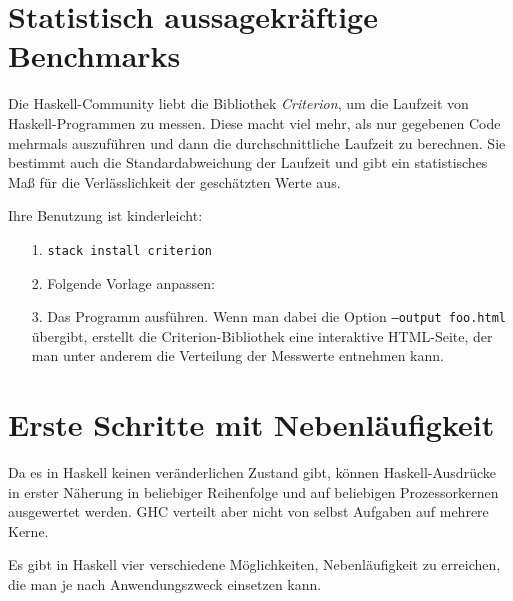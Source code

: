\documentclass{uebblatt}
\begin{document}

\section{Statistisch aussagekräftige Benchmarks}

Die Haskell-Community liebt die Bibliothek \emph{Criterion}, um die Laufzeit
von Haskell-Programmen zu messen. Diese macht viel mehr, als nur gegebenen Code
mehrmals auszuführen und dann die durchschnittliche Laufzeit zu berechnen. Sie
bestimmt auch die Standardabweichung der Laufzeit und gibt ein statistisches
Maß für die Verlässlichkeit der geschätzten Werte aus.

Ihre Benutzung ist kinderleicht:

\begin{enumerate}
\item[1.] \texttt{stack install criterion}
\item[2.] Folgende Vorlage anpassen:


\item[3.] Das Programm ausführen. Wenn man dabei die Option \texttt{--output
foo.html} übergibt, erstellt die Criterion-Bibliothek eine interaktive
HTML-Seite, der man unter anderem die Verteilung der Messwerte entnehmen kann.
\end{enumerate}


\section{Erste Schritte mit Nebenläufigkeit}

Da es in Haskell keinen veränderlichen Zustand gibt, können Haskell-Ausdrücke
in erster Näherung in beliebiger Reihenfolge und auf beliebigen Prozessorkernen
ausgewertet werden. GHC verteilt aber nicht von selbst Aufgaben auf mehrere
Kerne.

Es gibt in Haskell vier verschiedene Möglichkeiten, Nebenläufigkeit zu
erreichen, die man je nach Anwendungszweck einsetzen kann.
\end{document}
